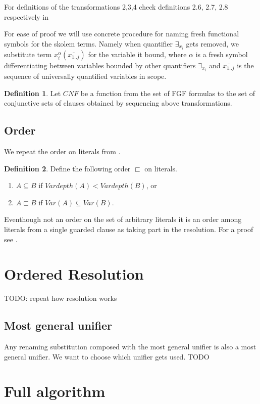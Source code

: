 \documentclass[english, shortabstract]{iithesis}
\theoremstyle{definition} \newtheorem{definition}{Definition}[chapter]
\theoremstyle{remark} \newtheorem{remark}[definition]{Observation}
\theoremstyle{plain} \newtheorem{theorem}[definition]{Theorem}
\theoremstyle{plain} \newtheorem{lemma}[definition]{Lemma}
\begin{document}
For definitions of the transformations 2,3,4 check definitions 2.6, 2.7, 2.8 respectively in \cite{resolution GF}

For ease of proof we will use concrete procedure for naming fresh functional symbols for the skolem terms.
Namely when quantifier $\exists_{x_i}$ gets removed, we substitute term $x_i^{\alpha}(\bar{x_{1..j}})$ for the variable it bound, 
where $\alpha$ is a fresh symbol differentiating between variables bounded by other quantifiers $\exists_{x_i}$ and $\bar{x_{1..j}}$ is the sequence of universally quantified variables in scope.

\begin{definition}
    Let $CNF$ be a function from the set of FGF formulas to the set of conjunctive sets of clauses obtained by sequencing above transformations.
\end{definition}

\subsection{Order}

We repeat the order on literals from \cite{resolution gf}.
\begin{definition}
Define the following order $\sqsubset$ on literals.
\begin{enumerate}
    \item $A \subseteq B$ if $Vardepth(A) < Vardepth(B)$, or
    \item $A \sqsubset B$ if $Var(A) \subseteq Var(B)$.
\end{enumerate}
\end{definition}
Eventhough not an order on the set of arbitrary literals it is an order among literals from a single guarded clause as taking part in the resolution.
For a proof see \cite{resolution gf}.


\section{Ordered Resolution}
TODO: repeat how resolution works

\subsection{Most general unifier}
Any renaming substitution composed with the most general unifier is also a most general unifier.
We want to choose which unifier gets used. TODO

\section{Full algorithm}
\end{document}
